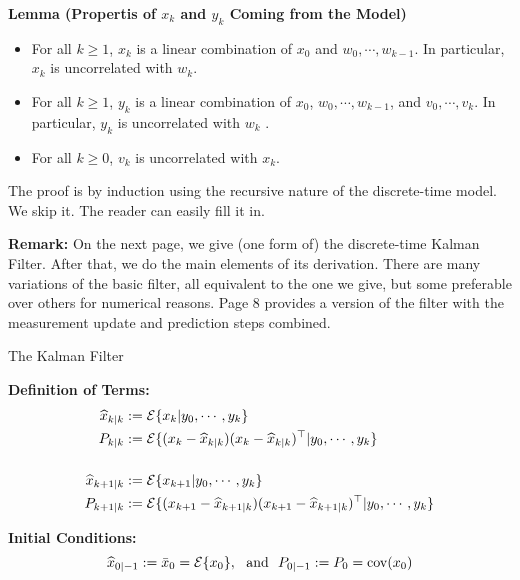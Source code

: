 \documentclass[letterpaper]{article}
\newcommand{\cov}{\mathrm{cov}}
\newcommand{\Expectof}[1]{{\cal E} \{ #1 \}}
\newcommand{\ExpectofGiven}[2]{{\cal E} \{ #1 | #2 \}}
\begin{document}
 \textbf{Lemma (Propertis of $x_k$ and $y_k$ Coming from the Model)}
 \begin{itemize}
\setlength{\itemsep}{.5cm}
\item  For all $k\ge 1$, $x_k$ is a linear combination of $x_0$ and $w_0, \cdots, w_{k-1}$. In particular, $x_k$ is uncorrelated with $w_k$.

\item  For all $k\ge 1$, $y_k$ is a linear combination of $x_0$, $w_0, \cdots, w_{k-1}$, and $v_0, \cdots, v_k$. In particular, $y_k$ is uncorrelated with $w_k$ .

    \item For all $k\ge 0$, $v_k$ is uncorrelated with $x_k$.

\end{itemize}

The proof is by induction using the recursive nature of the discrete-time model. We skip it. The reader can easily fill it in.

\vspace*{2cm}

\textbf{Remark:} On the next page, we give (one form of) the discrete-time Kalman Filter. After that, we do the main elements of its derivation. There are many variations of the basic filter, all equivalent to the one we give, but some preferable over others for numerical reasons. Page 8 provides a version of the filter with the measurement update and prediction steps combined.

 \newpage
 {\Large \bf
\begin{center}
The Kalman Filter
\end{center}
}

\textbf{Definition of Terms:}
\begin{align*}
\widehat{x}_{k|k} &:= \ExpectofGiven{x_k}{y_0, \cdots, y_k}\\
P_{k|k} &:=\ExpectofGiven{(x_k-\widehat{x}_{k|k})(x_k-\widehat{x}_{k|k})^\top}{y_0, \cdots, y_k}\\
& \\
\widehat{x}_{k+1|k} &:= \ExpectofGiven{ x_{k+1} }{ y_0, \cdots, y_k}\\
P_{k+1|k}&:= \ExpectofGiven{(x_{k+1}-\widehat{x}_{k+1|k})(x_{k+1}-\widehat{x}_{k+1|k})^\top}{y_0, \cdots, y_k}\\
\end{align*}

\textbf{Initial Conditions:}
$$\widehat{x}_{0|-1} :=\bar{x}_0 = \Expectof{x_0},~~\mbox{and}~~P_{0|-1}:=P_0=\cov(x_0)  $$
\end{document}
